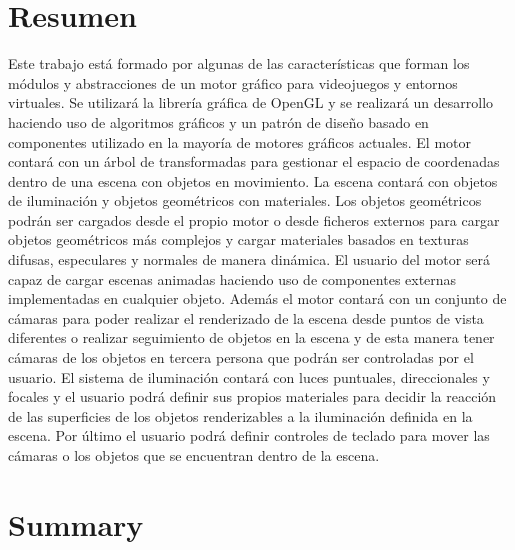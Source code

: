 \documentclass[a4paper, 17pt]{book}
\begin{document}
\chapter*{Resumen}

Este trabajo está formado por algunas de las características que forman los módulos 
y abstracciones de un motor gráfico para videojuegos y entornos virtuales. Se utilizará 
la librería gráfica de OpenGL y se realizará un desarrollo haciendo uso de algoritmos 
gráficos y un patrón de diseño basado en componentes utilizado en la mayoría de motores
gráficos actuales. 
\bigbreak
El motor contará con un árbol de transformadas para gestionar el espacio de coordenadas 
dentro de una escena con objetos en movimiento. La escena contará con objetos de iluminación 
y objetos geométricos con materiales. Los objetos geométricos podrán ser cargados desde el 
propio motor o desde ficheros externos para cargar objetos geométricos más complejos y 
cargar materiales basados en texturas difusas, especulares y normales de manera dinámica. 
El usuario del motor será capaz de cargar escenas animadas haciendo uso de componentes 
externas implementadas en cualquier objeto. Además el motor contará con un conjunto de 
cámaras para poder realizar el renderizado de la escena desde puntos de vista diferentes 
o realizar seguimiento de objetos en la escena y de esta manera tener cámaras de los 
objetos en tercera persona que podrán ser controladas por el usuario. El sistema de 
iluminación contará con luces puntuales, direccionales y focales y el usuario podrá 
definir sus propios materiales para decidir la reacción de las superficies de los 
objetos renderizables a la iluminación definida en la escena. Por último el usuario 
podrá definir controles de teclado para mover las cámaras o los objetos que se encuentran 
dentro de la escena.


\chapter*{Summary}
\end{document}
